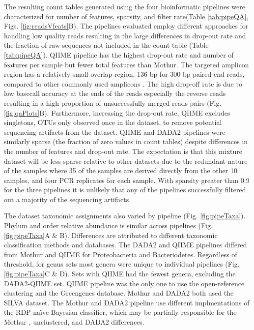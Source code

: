 \documentclass{bmcart}
\begin{document}
The resulting count tables generated using the four bioinformatic
pipelines were characterized for number of features, sparsity, and
filter rate(Table \ref{tab:pipeQA}, Figs. \ref{fig:readsVfeats}B). The
pipelines evaluated employ different approaches for handling low quality
reads resulting in the large differences in drop-out rate and the
fraction of raw sequences not included in the count table (Table
\ref{tab:pipeQA}). QIIME pipeline has the highest drop-out rate and
number of features per sample but fewer total features than Mothur. The
targeted amplicon region has a relatively small overlap region, 136 bp
for 300 bp paired-end reads, compared to other commonly used amplicons
\cite{kozich2013development,Walters2016-lf}. The high drop-off
rate is due to low basecall accuracy at the ends of the reads especially
the reverse reads resulting in a high proportion of unsuccessfully
merged reads pairs (Fig. \ref{fig:qaPlots}B). Furthermore, increasing
the drop-out rate, QIIME excludes singletons, OTUs only observed once in
the dataset, to remove potential sequencing artifacts from the dataset.
QIIME and DADA2 pipelines were similarly sparse (the fraction of zero
values in count tables) despite differences in the number of features
and drop-out rate. The expectation is that this mixture dataset will be
less sparse relative to other datasets due to the redundant nature of
the samples where 35 of the samples are derived directly from the other
10 samples, and four PCR replicates for each sample. With sparsity
greater than 0.9 for the three pipelines it is unlikely that any of the
pipelines successfully filtered out a majority of the sequencing
artifacts.

The dataset taxonomic assignments also varied by pipeline (Fig.
\ref{fig:pipeTaxa}). Phylum and order relative abundance is similar
across pipelines (Fig. \ref{fig:pipeTaxa}A \& B). Differences are
attributed to different taxonomic classification methods and databases.
The DADA2 and QIIME pipelines differed from Mothur and QIIME for
Proteobacteria and Bacteriodetes. Regardless of threshold, for genus
sets most genera were unique to individual pipelines (Fig.
\ref{fig:pipeTaxa}C \& D). Sets with QIIME had the fewest genera,
excluding the DADA2-QIIME set. QIIME pipeline was the only one to use
the open-reference clustering and the Greengenes database. Mothur and
DADA2 both used the SILVA dataset. The Mothur and DADA2 pipeline use
different implmentations of the RDP naïve Bayesian classifier, which may
be partially responsible for the Mothur , unclustered, and DADA2
differences.
\end{document}
